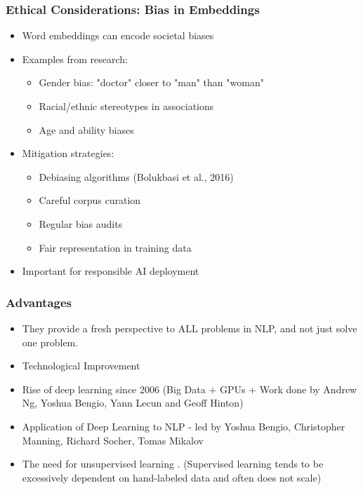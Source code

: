 \begin{frame}[fragile]\frametitle{Ethical Considerations: Bias in Embeddings}
\begin{itemize}
\item Word embeddings can encode societal biases
\item Examples from research:
  \begin{itemize}
  \item Gender bias: "doctor" closer to "man" than "woman"
  \item Racial/ethnic stereotypes in associations
  \item Age and ability biases
  \end{itemize}
\item Mitigation strategies:
  \begin{itemize}
  \item Debiasing algorithms (Bolukbasi et al., 2016)
  \item Careful corpus curation
  \item Regular bias audits
  \item Fair representation in training data
  \end{itemize}
\item Important for responsible AI deployment
\end{itemize}
\end{frame}

\begin{frame}[fragile]\frametitle{Advantages}

\begin{itemize}
\item They provide a fresh perspective to ALL  problems in NLP, and not just solve one problem.
\item Technological Improvement
\item Rise of deep learning since 2006 (Big Data + GPUs  + Work done by Andrew Ng, Yoshua Bengio, Yann Lecun and Geoff Hinton)
\item Application of Deep Learning to NLP - led by Yoshua Bengio,  Christopher Manning, Richard Socher, Tomas Mikalov
\item The need for unsupervised learning . (Supervised learning tends to be excessively dependent on hand-labeled data and often does not scale)
\end{itemize}
\end{frame}



